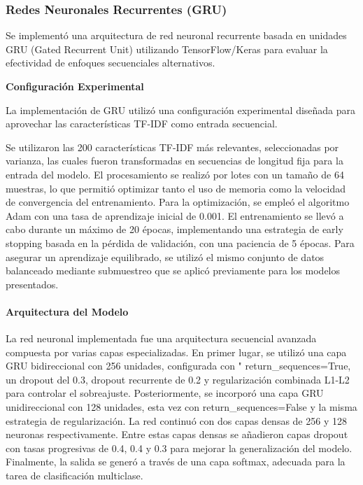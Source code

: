 \subsubsection{Redes Neuronales Recurrentes (GRU)}
Se implementó una arquitectura de red neuronal recurrente basada en unidades GRU (Gated Recurrent Unit) utilizando TensorFlow/Keras para evaluar la efectividad de enfoques secuenciales alternativos.

\textbf{Configuración Experimental}

La implementación de GRU utilizó una configuración experimental diseñada para aprovechar las características TF-IDF como entrada secuencial. 

Se utilizaron las 200 características TF-IDF más relevantes, seleccionadas por varianza, las cuales fueron transformadas en secuencias de longitud fija para la entrada del modelo. El procesamiento se realizó por lotes con un tamaño de 64 muestras, lo que permitió optimizar tanto el uso de memoria como la velocidad de convergencia del entrenamiento. Para la optimización, se empleó el algoritmo Adam con una tasa de aprendizaje inicial de 0.001. El entrenamiento se llevó a cabo durante un máximo de 20 épocas, implementando una estrategia de early stopping basada en la pérdida de validación, con una paciencia de 5 épocas. Para asegurar un aprendizaje equilibrado, se utilizó el mismo conjunto de datos balanceado mediante submuestreo que se aplicó previamente para los modelos presentados.

\paragraph{Arquitectura del Modelo}
La red neuronal implementada fue una arquitectura secuencial avanzada compuesta por varias capas especializadas. En primer lugar, se utilizó una capa GRU bidireccional con 256 unidades, configurada con "
return\_sequences=True, un dropout del 0.3, dropout recurrente de 0.2 y regularización combinada L1-L2 para controlar el sobreajuste. Posteriormente, se incorporó una capa GRU unidireccional con 128 unidades, esta vez con return\_sequences=False y la misma estrategia de regularización. La red continuó con dos capas densas de 256 y 128 neuronas respectivamente. Entre estas capas densas se añadieron capas dropout con tasas progresivas de 0.4, 0.4 y 0.3 para mejorar la generalización del modelo. Finalmente, la salida se generó a través de una capa softmax, adecuada para la tarea de clasificación multiclase.

